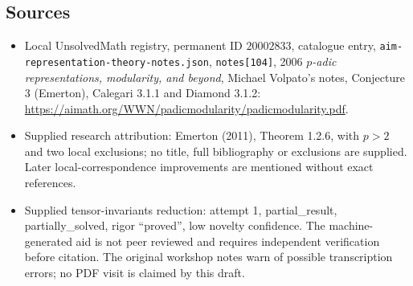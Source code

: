 \documentclass[11pt]{article}
\begin{document}
\subsection{Sources}
\begin{itemize}
\item Local UnsolvedMath registry, permanent ID \(20002833\), catalogue entry, \texttt{aim-representation-theory-notes.json}, \texttt{notes[104]}, 2006 \emph{\(p\)-adic representations, modularity, and beyond}, Michael Volpato's notes, Conjecture 3 (Emerton), Calegari 3.1.1 and Diamond 3.1.2: \url{https://aimath.org/WWN/padicmodularity/padicmodularity.pdf}.
\item Supplied research attribution: Emerton (2011), Theorem 1.2.6, with \(p>2\) and two local exclusions; no title, full bibliography or exclusions are supplied. Later local-correspondence improvements are mentioned without exact references.
\item Supplied tensor-invariants reduction: attempt 1, partial\_result, partially\_solved, rigor ``proved'', low novelty confidence. The machine-generated aid is not peer reviewed and requires independent verification before citation. The original workshop notes warn of possible transcription errors; no PDF visit is claimed by this draft.
\end{itemize}
\end{document}
